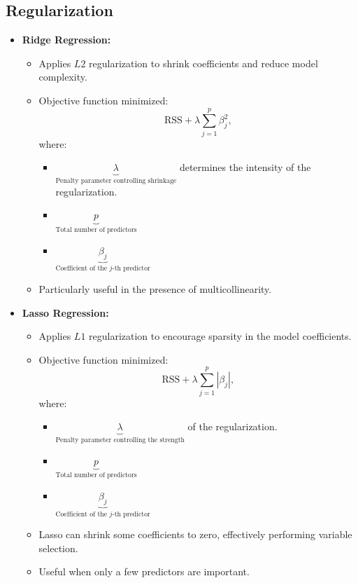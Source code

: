 \documentclass[10pt]{article}
\begin{document}
\subsection{Regularization}
\begin{itemize}
    \item \textbf{Ridge Regression:}
    \begin{itemize}
        \item Applies \(L2\) regularization to shrink coefficients and reduce model complexity.
        \item Objective function minimized:
        \[
        \text{RSS} + \lambda \sum_{j=1}^p \beta_j^2,
        \]
        where:
        \begin{itemize}
            \item \(\underbrace{\lambda}_{\text{Penalty parameter controlling shrinkage}}\) determines the intensity of the regularization.
            \item \(\underbrace{p}_{\text{Total number of predictors}}\)
            \item \(\underbrace{\beta_j}_{\text{Coefficient of the }j\text{-th predictor}}\)
        \end{itemize}
        \item Particularly useful in the presence of multicollinearity.
    \end{itemize}
    \item \textbf{Lasso Regression:}
    \begin{itemize}
        \item Applies \(L1\) regularization to encourage sparsity in the model coefficients.
        \item Objective function minimized:
        \[
        \text{RSS} + \lambda \sum_{j=1}^p |\beta_j|,
        \]
        where:
        \begin{itemize}
            \item \(\underbrace{\lambda}_{\text{Penalty parameter controlling the strength}}\) of the regularization.
            \item \(\underbrace{p}_{\text{Total number of predictors}}\)
            \item \(\underbrace{\beta_j}_{\text{Coefficient of the }j\text{-th predictor}}\)
        \end{itemize}
        \item Lasso can shrink some coefficients to zero, effectively performing variable selection.
        \item Useful when only a few predictors are important.
    \end{itemize}
\end{itemize}
\end{document}
